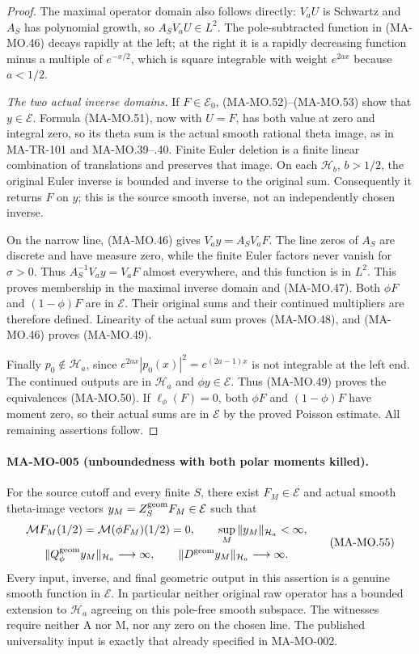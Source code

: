 \begin{proof}
The maximal operator domain also follows directly:
\(V_aU\) is Schwartz and \(A_S\) has polynomial growth, so
\(A_SV_aU\in L^2\). The pole-subtracted function in (MA-MO.46)
decays rapidly at the left; at the right it is a rapidly
decreasing function minus a multiple of \(e^{-x/2}\), which is
square integrable with weight \(e^{2ax}\) because \(a<1/2\).

\emph{The two actual inverse domains.}
If \(F\in\mathcal E_0\), (MA-MO.52)--(MA-MO.53) show that
\(y\in\mathcal E\). Formula (MA-MO.51), now with \(U=F\),
has both value at zero and integral zero, so its theta sum is
the actual smooth rational theta image, as in MA-TR-101 and
MA-MO.39--.40. Finite Euler deletion is a finite linear
combination of translations and preserves that image.
On each \(\mathcal H_b\), \(b>1/2\), the original Euler inverse
is bounded and inverse to the original sum. Consequently it
returns \(F\) on \(y\); this is the source smooth inverse,
not an independently chosen inverse.

On the narrow line, (MA-MO.46) gives
\(V_ay=A_SV_aF\). The line zeros of \(A_S\) are discrete
and have measure zero, while the finite Euler factors never
vanish for \(\sigma>0\). Thus \(A_S^{-1}V_ay=V_aF\) almost
everywhere, and this function is in \(L^2\). This proves
membership in the maximal inverse domain and (MA-MO.47).
Both \(\phi F\) and \((1-\phi)F\) are in \(\mathcal E\).
Their original sums and their continued multipliers are
therefore defined. Linearity of the actual sum proves
(MA-MO.48), and (MA-MO.46) proves (MA-MO.49).

Finally \(p_0\notin\mathcal H_a\), since
\(e^{2ax}|p_0(x)|^2=e^{(2a-1)x}\) is not integrable at
the left end. The continued outputs are in \(\mathcal H_a\)
and \(\phi y\in\mathcal E\). Thus (MA-MO.49) proves the
equivalences (MA-MO.50). If \(\ell_\phi(F)=0\), both
\(\phi F\) and \((1-\phi)F\) have moment zero, so their
actual sums are in \(\mathcal E\) by the proved Poisson
estimate. All remaining assertions follow.
\end{proof}

\paragraph{MA-MO-005 (unboundedness with both polar moments killed).}
For the source cutoff and every finite \(S\), there exist
\(F_M\in\mathcal E\) and actual smooth theta-image vectors
\(y_M=Z_S^{\rm geom}F_M\in\mathcal E\) such that
\[
 \begin{gathered}
 \mathcal MF_M(1/2)=\mathcal M(\phi F_M)(1/2)=0,
       \qquad \sup_M\|y_M\|_{\mathcal H_a}<\infty,\\
 \|Q_\phi^{\rm geom}y_M\|_{\mathcal H_a}\longrightarrow\infty,
 \qquad
 \|D^{\rm geom}y_M\|_{\mathcal H_a}\longrightarrow\infty.
 \end{gathered}
 \tag{MA-MO.55}
\]
Every input, inverse, and final geometric output in this assertion
is a genuine smooth function in \(\mathcal E\). In particular
neither original raw operator has a bounded extension to
\(\mathcal H_a\) agreeing on this pole-free smooth subspace.
The witnesses require neither A nor M, nor any zero on the
chosen line. The published universality input is exactly that
already specified in MA-MO-002.

